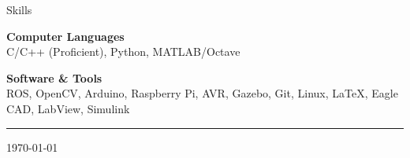 \documentclass{resume} %
\begin{document}
\begin{rSection}{Skills}


\textbf{Computer Languages }\\
C/C++ (Proficient), Python, MATLAB/Octave

\vspace{0.5 em}

\textbf{Software \& Tools}\\
ROS, OpenCV, Arduino, Raspberry Pi, AVR, Gazebo, Git, Linux, \LaTeX, Eagle CAD, LabView, Simulink \\


\end{rSection}
%

\vspace{0.5 em}
\hrule
\monthyeardate\today
\end{document}
